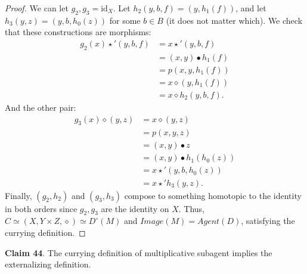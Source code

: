 \documentclass{article}
\begin{document}
\begin{proof}
We can let $g_2, g_3 = \text{id}_X$.
Let $h_2(y, b, f) = (y, h_1(f))$, and let $h_3(y, z) = (y, b, h_0(z))$ for some $b \in B$ (it does not matter which).
We check that these constructions are morphisms:
\[
\begin{split}
    g_2(x) \star' (y, b, f) & = x \star' (y, b, f) \\
                            & = (x, y) \bullet h_1(f) \\
                            & = p(x, y, h_1(f)) \\
                            & = x \diamond (y, h_1(f)) \\
                            & = x \diamond h_2(y, b, f). 
\end{split}
\]
And the other pair:
\[
\begin{split}
    g_3(x) \diamond (y, z) & = x \diamond (y, z) \\
                           & = p(x, y, z) \\
                           & = (x, y) \bullet z \\
                           & = (x, y) \bullet h_1(h_0(z)) \\
                           & = x \star' (y, b, h_0(z)) \\
                           & = x \star' h_3(y, z).
\end{split}
\]
Finally, $(g_2, h_2)$ and $(g_3, h_3)$ compose to something homotopic to the identity in both orders since $g_2, g_3$ are the identity on $X$.
Thus, $C \simeq (X, Y \times Z, \diamond) \simeq D^{\circ}(M)$ and $Image(M) = Agent(D)$, satisfying the currying definition.
\end{proof}

\bigskip
\noindent \textbf{Claim 44}.
The currying definition of multiplicative subagent implies the externalizing definition.
\end{document}
